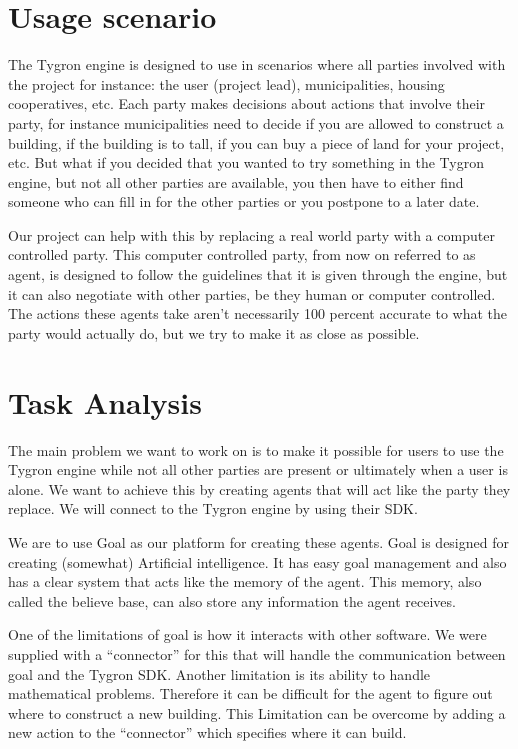 \section{Usage scenario}
The Tygron engine is designed to use in scenarios where all parties involved with the project for instance: the user (project lead), municipalities, housing cooperatives, etc. Each party makes decisions about actions that involve their party, for instance municipalities need to decide if you are allowed to construct a building, if the building is to tall, if you can buy a piece of land for your project, etc. But what if you decided that you wanted to try something in the Tygron engine, but not all other parties are available, you then have to either find someone who can fill in for the other parties or you postpone to a later date.

Our project can help with this by replacing a real world party with a computer controlled party. This computer controlled party, from now on referred to as agent, is designed to follow the guidelines that it is given through the engine, but it can also negotiate with other parties, be they human or computer controlled. The actions these agents take aren’t necessarily 100 percent accurate to what the party would actually do, but we try to make it as close as possible.

\section{Task Analysis}
The main problem we want to work on is to make it possible for users to use the Tygron engine while not all other parties are present or ultimately when a user is alone. We want to achieve this by creating agents that will act like the party they replace. We will connect to the Tygron engine by using their SDK. 

We are to use Goal as our platform for creating these agents. Goal is designed for creating (somewhat) Artificial intelligence. It has easy goal management and also has a clear system that acts like the memory of the agent. This memory, also called the believe base, can also store any information the agent receives. 

One of the limitations of goal is how it interacts with other software. We were supplied with a “connector” for this that will handle the communication between goal and the Tygron SDK. Another limitation is its ability to handle mathematical problems. Therefore it can be difficult for the agent to figure out where to construct a new building. This Limitation can be overcome by adding a new action to the “connector” which specifies where it can build.

